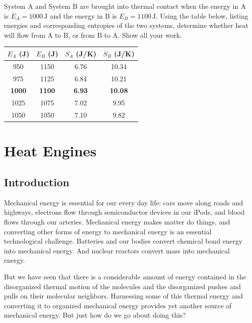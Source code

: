 \begin{exercise}
System A and System B are brought into thermal contact when the energy in
A is $E_A= 1000\,\text{J}$ and the energy in B is $E_B=1100\,\text{J}$.
Using the table below, listing energies and corresponding entropies of
the two systems, determine whether heat will flow from A to B, or 
from B to A.  Show all your work.

\begin{center}
{\large

\begin{tabular}{|c|c|c|c|} \hline
$E_A$ (J) & $E_B$ (J)  & $S_A$ (J/K) & $S_B$ (J/K)
     \\ \hline \hline
    950   &       1150   &     6.76     &    10.34     \\ \hline
    975   &       1125   &     6.84     &    10.21     \\ \hline
\textbf{1000}&  \textbf{1100}  & \textbf{6.93}   & \textbf{  10.08} \\ \hline
    1025   &      1075   &     7.02     &     9.95     \\ \hline
    1050   &      1050   &     7.10     &     9.82     \\ \hline
\end{tabular}

}
\end{center}
\label{prob:energy_transfer_table}
\end{exercise}




\chapter{Heat Engines}
\label{chap:heat_engines}

\section{Introduction}

Mechanical energy is essential for our every day life: cars move
along roads and highways, electrons flow through 
semiconductor devices in our iPods,
and blood flows through our arteries.  Mechanical energy makes matter
do things, and converting other forms of energy to mechanical energy
is an essential technological challenge.  Batteries and our bodies
convert chemical bond energy into mechanical energy.  And nuclear reactors
convert mass into mechanical energy.

But we have seen that there is a considerable amount of energy
contained in the disorganized thermal motion of the molecules and the
disorganized pushes and pulls on their molecular neighbors.
Harnessing some of this thermal energy and converting it to organized
mechanical energy provides yet another source of mechanical energy.
But just how do we go about doing this?

